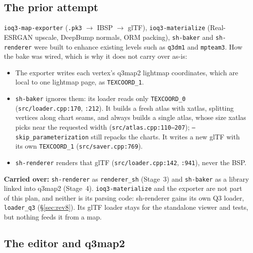\documentclass[11pt,a4paper]{article}
\begin{document}
\subsection{The prior attempt}\label{sec:prior}

\texttt{ioq3-map-exporter} (\texttt{.pk3} $\to$ IBSP $\to$ glTF), \texttt{ioq3-materialize}
(Real-ESRGAN upscale, DeepBump normals, ORM packing), \texttt{sh-baker} and \texttt{sh-renderer}
were built to enhance existing levels such as \texttt{q3dm1} and \texttt{mpteam3}. How the bake was
wired, which is why it does not carry over as-is:
\begin{itemize}
\item The exporter writes each vertex's q3map2 lightmap coordinates, which are local to one
  lightmap page, as \texttt{TEXCOORD\_1}.
\item \texttt{sh-baker} ignores them: its loader reads only \texttt{TEXCOORD\_0}
  (\texttt{src/loader.cpp:170}, \texttt{:212}). It builds a fresh atlas with xatlas, splitting
  vertices along chart seams, and always builds a single atlas, whose size xatlas picks near the
  requested width (\texttt{src/atlas.cpp:110--207}); \texttt{--skip\_parameterization} still repacks the charts.
  It writes a new glTF with its own \texttt{TEXCOORD\_1} (\texttt{src/saver.cpp:769}).
\item \texttt{sh-renderer} renders that glTF (\texttt{src/loader.cpp:142}, \texttt{:941}), never
  the BSP.
\end{itemize}
\textbf{Carried over:} \texttt{sh-renderer} as \texttt{renderer\_sh} (Stage~3) and \texttt{sh-baker}
as a library linked into q3map2 (Stage~4). \texttt{ioq3-materialize} and the exporter are not part
of this plan, and neither is its parsing code: sh-renderer gains its own Q3 loader,
\texttt{loader\_q3} (§\ref{sec:rev8}). Its glTF loader stays for the standalone viewer and tests,
but nothing feeds it from a map.

\subsection{The editor and q3map2}
\end{document}
